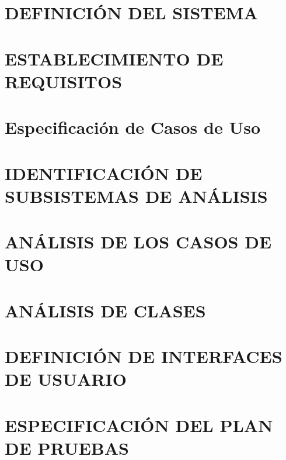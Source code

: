 \section{DEFINICIÓN DEL SISTEMA}



\newpage
\section{ESTABLECIMIENTO DE REQUISITOS}


\newpage
\section{Especificación de Casos de Uso}


\newpage
\section{IDENTIFICACIÓN DE SUBSISTEMAS DE ANÁLISIS}


\newpage
\section{ANÁLISIS DE LOS CASOS DE USO}


\newpage
\section{ANÁLISIS DE CLASES}



\newpage
\section{DEFINICIÓN DE INTERFACES DE USUARIO}



\newpage
\section{ESPECIFICACIÓN DEL PLAN DE PRUEBAS}
